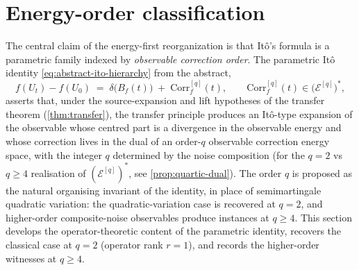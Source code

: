 \documentclass[11pt,reqno]{amsart}
\theoremstyle{plain}
\theoremstyle{definition}
\theoremstyle{remark}
\newcommand{\Energy}{\mathcal{E}}
\begin{document}
\section{Energy-order classification}\label{sec:energy-order}

The central claim of the energy-first reorganization is that It\^o's
formula is a parametric family indexed by \emph{observable correction
order}. The parametric It\^o identity
\eqref{eq:abstract-ito-hierarchy} from the abstract,
\begin{equation*}
  f(U_t)-f(U_0)\;=\;\delta\bigl(B_f(t)\bigr)\;+\;\mathrm{Corr}_f^{[q]}(t),
  \qquad\mathrm{Corr}_f^{[q]}(t)\in\bigl(\Energy^{[q]}\bigr)^{*},
\end{equation*}
asserts that, under the source-expansion and lift hypotheses of the
transfer theorem (\cref{thm:transfer}), the transfer principle
produces an It\^o-type expansion of the observable whose centred part
is a divergence in the observable energy and whose correction lives in
the dual of an order-$q$ observable correction energy space, with the
integer $q$ determined by the noise composition (for the $q=2$ vs
$q\ge 4$ realisation of $(\Energy^{[q]})^{*}$, see
\cref{prop:quartic-dual}). The order $q$ is proposed as the natural organising invariant of the
identity, in place of semimartingale quadratic variation: the
quadratic-variation case is recovered at $q=2$, and higher-order
composite-noise observables produce instances at $q\ge 4$. This section develops the operator-theoretic content of the
parametric identity, recovers the classical case at $q=2$ (operator
rank $r=1$), and records the higher-order witnesses at $q\ge 4$.
\end{document}
